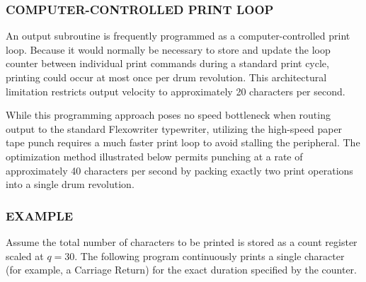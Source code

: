 \subsubsection*{COMPUTER-CONTROLLED PRINT LOOP}

An output subroutine is frequently programmed as a computer-controlled print loop. Because it would normally be necessary to store and update the loop counter between individual print commands during a standard print cycle, printing could occur at most once per drum revolution. This architectural limitation restricts output velocity to approximately 20 characters per second. 

While this programming approach poses no speed bottleneck when routing output to the standard Flexowriter typewriter, utilizing the high-speed paper tape punch requires a much faster print loop to avoid stalling the peripheral. The optimization method illustrated below permits punching at a rate of approximately 40 characters per second by packing exactly two print operations into a single drum revolution.

\subsubsection*{EXAMPLE}
Assume the total number of characters to be printed is stored as a count register scaled at $q = 30$. The following program continuously prints a single character (for example, a Carriage Return) for the exact duration specified by the counter.

